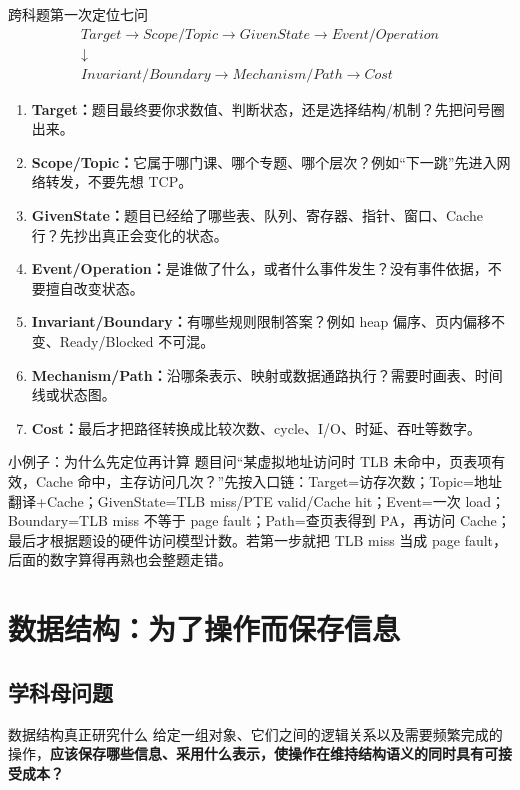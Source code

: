 \documentclass[11pt,a4paper,openany]{ctexbook}
\newcommand{\key}[1]{\textbf{\color{deep}#1}}
\begin{document}
\begin{examBox}{跨科题第一次定位七问}
\[
\boxed{\begin{gathered}
Target\rightarrow Scope/Topic\rightarrow GivenState\rightarrow Event/Operation\\
\downarrow\\
Invariant/Boundary\rightarrow Mechanism/Path\rightarrow Cost
\end{gathered}}
\]
\begin{enumerate}
  \item \key{Target：}题目最终要你求数值、判断状态，还是选择结构/机制？先把问号圈出来。
  \item \key{Scope/Topic：}它属于哪门课、哪个专题、哪个层次？例如“下一跳”先进入网络转发，不要先想 TCP。
  \item \key{GivenState：}题目已经给了哪些表、队列、寄存器、指针、窗口、Cache 行？先抄出真正会变化的状态。
  \item \key{Event/Operation：}是谁做了什么，或者什么事件发生？没有事件依据，不要擅自改变状态。
  \item \key{Invariant/Boundary：}有哪些规则限制答案？例如 heap 偏序、页内偏移不变、Ready/Blocked 不可混。
  \item \key{Mechanism/Path：}沿哪条表示、映射或数据通路执行？需要时画表、时间线或状态图。
  \item \key{Cost：}最后才把路径转换成比较次数、cycle、I/O、时延、吞吐等数字。
\end{enumerate}
\end{examBox}

\begin{methodbox}{小例子：为什么先定位再计算}
题目问“某虚拟地址访问时 TLB 未命中，页表项有效，Cache 命中，主存访问几次？”先按入口链：Target=访存次数；Topic=地址翻译+Cache；GivenState=TLB miss/PTE valid/Cache hit；Event=一次 load；Boundary=TLB miss 不等于 page fault；Path=查页表得到 PA，再访问 Cache；最后才根据题设的硬件访问模型计数。若第一步就把 TLB miss 当成 page fault，后面的数字算得再熟也会整题走错。
\end{methodbox}

\chapter{数据结构：为了操作而保存信息}

\section{学科母问题}
\begin{corebox}{数据结构真正研究什么}
给定一组对象、它们之间的逻辑关系以及需要频繁完成的操作，\key{应该保存哪些信息、采用什么表示，使操作在维持结构语义的同时具有可接受成本？}
\end{corebox}
\end{document}
